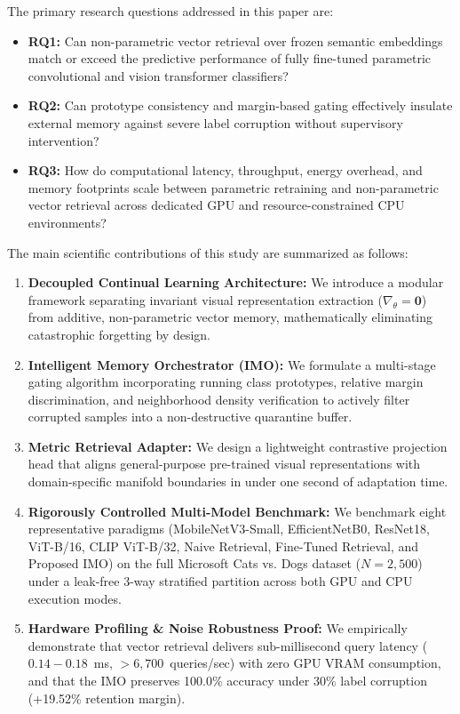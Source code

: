 \documentclass[sn-mathphys,Numbered]{sn-jnl}
\begin{document}
The primary research questions addressed in this paper are:
\begin{itemize}
    \item \textbf{RQ1:} Can non-parametric vector retrieval over frozen semantic embeddings match or exceed the predictive performance of fully fine-tuned parametric convolutional and vision transformer classifiers?
    \item \textbf{RQ2:} Can prototype consistency and margin-based gating effectively insulate external memory against severe label corruption without supervisory intervention?
    \item \textbf{RQ3:} How do computational latency, throughput, energy overhead, and memory footprints scale between parametric retraining and non-parametric vector retrieval across dedicated GPU and resource-constrained CPU environments?
\end{itemize}

The main scientific contributions of this study are summarized as follows:
\begin{enumerate}
    \item \textbf{Decoupled Continual Learning Architecture:} We introduce a modular framework separating invariant visual representation extraction ($\nabla_\theta = \mathbf{0}$) from additive, non-parametric vector memory, mathematically eliminating catastrophic forgetting by design.
    \item \textbf{Intelligent Memory Orchestrator (IMO):} We formulate a multi-stage gating algorithm incorporating running class prototypes, relative margin discrimination, and neighborhood density verification to actively filter corrupted samples into a non-destructive quarantine buffer.
    \item \textbf{Metric Retrieval Adapter:} We design a lightweight contrastive projection head that aligns general-purpose pre-trained visual representations with domain-specific manifold boundaries in under one second of adaptation time.
    \item \textbf{Rigorously Controlled Multi-Model Benchmark:} We benchmark eight representative paradigms (MobileNetV3-Small, EfficientNetB0, ResNet18, ViT-B/16, CLIP ViT-B/32, Naive Retrieval, Fine-Tuned Retrieval, and Proposed IMO) on the full Microsoft Cats vs. Dogs dataset ($N=2,500$) under a leak-free 3-way stratified partition across both GPU and CPU execution modes.
    \item \textbf{Hardware Profiling & Noise Robustness Proof:} We empirically demonstrate that vector retrieval delivers sub-millisecond query latency ($0.14 - 0.18$~ms, $>6,700$~queries/sec) with zero GPU VRAM consumption, and that the IMO preserves 100.0\% accuracy under 30\% label corruption (+19.52\% retention margin).
\end{enumerate}
\end{document}
